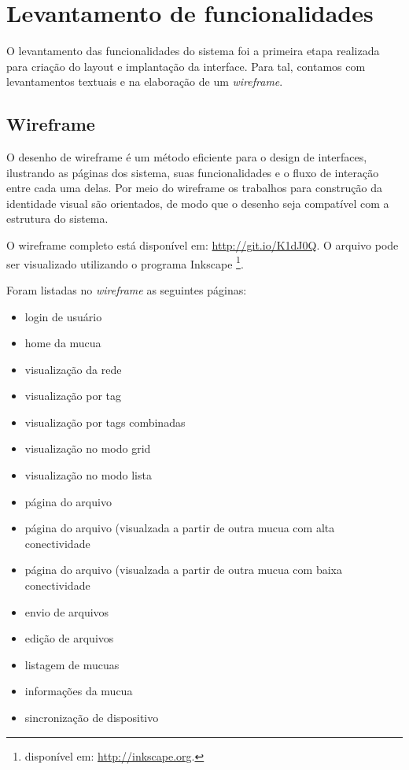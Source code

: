 \section{Levantamento de funcionalidades}
O levantamento das funcionalidades do sistema foi a primeira etapa
realizada para criação do layout e implantação da interface. Para
tal, contamos com levantamentos textuais e na elaboração de um
\emph{wireframe}.

\subsection{Wireframe}
O desenho de wireframe é um método eficiente para o design de
interfaces, ilustrando as páginas dos sistema, suas funcionalidades
e o fluxo de interação entre cada uma delas. Por meio do wireframe
os trabalhos para construção da identidade visual são orientados,
de modo que o desenho seja compatível com a estrutura do sistema.

O wireframe completo está disponível em: 
\url{http://git.io/K1dJ0Q}.
O arquivo pode ser visualizado utilizando o programa Inkscape \footnote{disponível
  em: \url{http://inkscape.org}.}.

Foram listadas no \emph{wireframe} as seguintes páginas:
\begin{itemize}
  \item login de usuário
  \item home da mucua
  \item visualização da rede
  \item visualização por tag
  \item visualização por tags combinadas
  \item visualização no modo grid
  \item visualização no modo lista
  \item página do arquivo
  \item página do arquivo (visualzada a partir de outra mucua com alta
    conectividade
  \item página do arquivo (visualzada a partir de outra mucua com baixa
    conectividade
  \item envio de arquivos
  \item edição de arquivos
  \item listagem de mucuas
  \item informações da mucua
  \item sincronização de dispositivo
\end{itemize}

